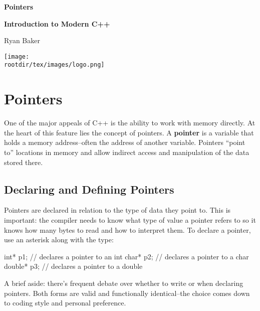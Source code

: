 \documentclass[12pt]{article}
\begin{document}
\begin{center}

\Huge\textbf{Pointers}

\vspace{1em}

\LARGE\textbf{Introduction to Modern C++}

\vspace{1em}

\Large{Ryan Baker}

\vfill

\texttt{[image: \\rootdir/tex/images/logo.png]}

\end{center}

\vfill

\tableofcontents

\pagebreak

\section{Pointers}

\noindent
One of the major appeals of C++ is the ability to work with memory directly.
At the heart of this feature lies the concept of pointers.
A \textbf{pointer} is a variable that holds a memory address--often the address of another variable.
Pointers ``point to'' locations in memory and allow indirect access and manipulation of the data stored there.

\subsection{Declaring and Defining Pointers}

\noindent
Pointers are declared in relation to the type of data they point to.
This is important: the compiler needs to know what type of value a pointer refers to so it knows how many bytes to read and how to interpret them.
To declare a pointer, use an asterisk \inlinecxx{*} along with the type:

\begin{cxx}{}
int*    p1; // declares a pointer to an int
char*   p2; // declares a pointer to a char
double* p3; // declares a pointer to a double
\end{cxx}

\noindent
A brief aside: there's frequent debate over whether to write  or  when declaring pointers.
Both forms are valid and functionally identical--the choice comes down to coding style and personal preference.
\end{document}
